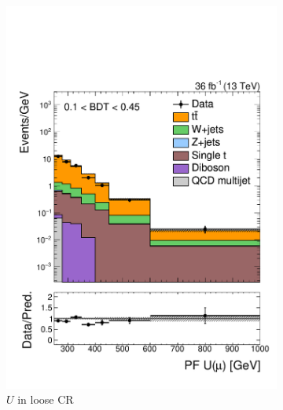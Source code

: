 \begin{figure}[]
    \begin{center}
        \begin{subfigure}[t]{0.32\textwidth}
            \includegraphics[width=\textwidth]{figures/monotop/prefit/singlemuontop_loose_pfUWmag_logy.pdf}
            \caption{$U$ in loose CR}
        \end{subfigure}
        \begin{subfigure}[t]{0.32\textwidth}

\end{subfigure}
\end{center}
\end{figure}
